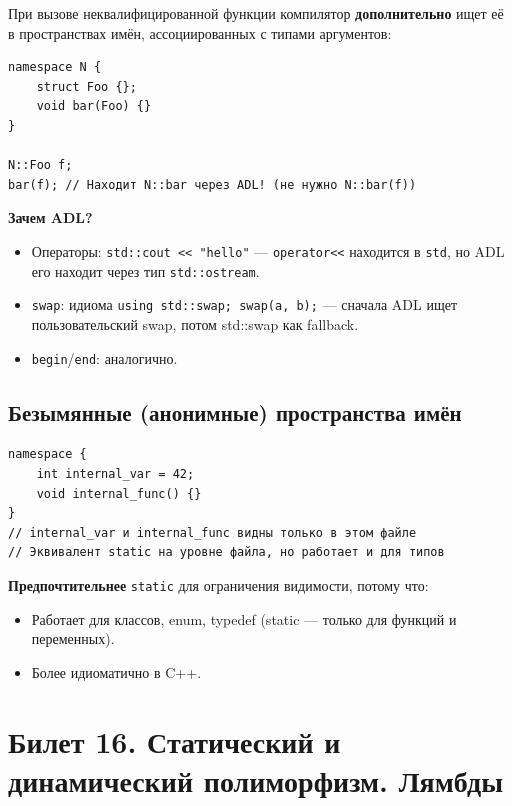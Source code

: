 \documentclass[12pt,a4paper]{article}
\begin{document}
При вызове неквалифицированной функции компилятор \textbf{дополнительно} ищет её в пространствах имён, ассоциированных с типами аргументов:

\begin{lstlisting}
namespace N {
    struct Foo {};
    void bar(Foo) {}
}

N::Foo f;
bar(f); // Находит N::bar через ADL! (не нужно N::bar(f))
\end{lstlisting}

\textbf{Зачем ADL?}
\begin{itemize}
    \item Операторы: \texttt{std::cout << "hello"} --- \texttt{operator<<} находится в \texttt{std}, но ADL его находит через тип \texttt{std::ostream}.
    \item \texttt{swap}: идиома \texttt{using std::swap; swap(a, b);} --- сначала ADL ищет пользовательский swap, потом std::swap как fallback.
    \item \texttt{begin}/\texttt{end}: аналогично.
\end{itemize}

\subsection{Безымянные (анонимные) пространства имён}

\begin{lstlisting}
namespace {
    int internal_var = 42;
    void internal_func() {}
}
// internal_var и internal_func видны только в этом файле
// Эквивалент static на уровне файла, но работает и для типов
\end{lstlisting}

\textbf{Предпочтительнее} \texttt{static} для ограничения видимости, потому что:
\begin{itemize}
    \item Работает для классов, enum, typedef (static --- только для функций и переменных).
    \item Более идиоматично в C++.
\end{itemize}

\section{Билет 16. Статический и динамический полиморфизм. Лямбды}
\end{document}

